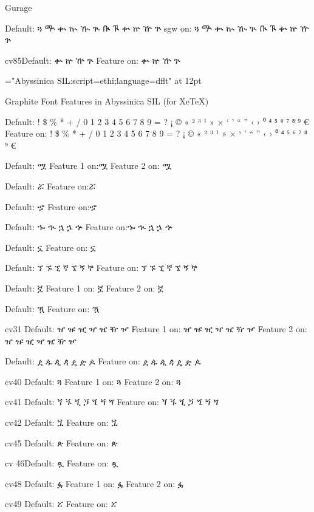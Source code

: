 \A Gurage

\IndSS  Default: ጓ ᎁ ቊ ኲ ዂ ጒ ᎅ ᎍ ቍ ኵ ዅ ጕ
\IndSS\sgw sgw on:  ጓ ᎁ ቊ ኲ ዂ ጒ ᎅ ᎍ ቍ ኵ ዅ ጕ

\IndSS cv85Default: ቍ ኵ ዅ ጕ 
\IndSS\eightyfive Feature on: ቍ ኵ ዅ ጕ


\font\C="Abyssinica SIL:script=ethi;language=dflt" at 12pt


\A Graphite Font Features in Abyssinica SIL (for XeTeX)

\IndSS Default: ! \$ \% * + / 0 1 2 3 4 5 6 7 8 9 = ? ¡ © « ² ³ ¹ » × ‘ ’ “ ” ‹ › ⁰ ⁴ ⁵ ⁶ ⁷ ⁸ ⁹ €
\IndSS\one Feature on: ! \$ \% * + / 0 1 2 3 4 5 6 7 8 9 = ? ¡ © « ² ³ ¹ » × ‘ ’ “ ” ‹ › ⁰ ⁴ ⁵ ⁶ ⁷ ⁸ ⁹ €


\IndSS Default: ሟ
\IndSS\fourone Feature 1 on:ሟ
\IndSS\fourtwo Feature 2 on: ሟ

\IndSS Default: ሯ
\IndSS\five Feature on:ሯ

\IndSS Default: ኇ
\IndSS\seventeen Feature on:ኇ

\IndSS Default: ኈ ኊ ኋ ኌ ኍ
\IndSS\eighteen Feature on:ኈ ኊ ኋ ኌ ኍ

\IndSS Default: ኗ
\IndSS\nineteen Feature on: ኗ

\IndSS Default: ኘ ኙ ኚ ኛ ኜ ኝ ኞ
\IndSS\twenty Feature on: ኘ ኙ ኚ ኛ ኜ ኝ ኞ

\IndSS Default: ኟ
\IndSS\twentyoneone Feature 1 on: ኟ
\IndSS\twentyonetwo Feature 2 on: ኟ

\IndSS Default: ዃ
\IndSS\twentysix Feature on: ዃ

\IndSS cv31 Default: ዠ ዡ ዢ ዣ ዤ ዥ ዦ
\IndSS\thirtyoneone Feature 1 on: ዠ ዡ ዢ ዣ ዤ ዥ ዦ
\IndSS\thirtyonetwo Feature 2 on: ዠ ዡ ዢ ዣ ዤ ዥ ዦ

\IndSS Default: ዸ ዹ ዺ ዻ ዼ ዽ ዾ
\IndSS\thirtytwo Feature on: ዸ ዹ ዺ ዻ ዼ ዽ ዾ

\IndSS cv40 Default: ጓ
\IndSS\fortyone Feature 1 on: ጓ
\IndSS\fortytwo Feature 2 on: ጓ

\IndSS cv41 Default: ጘ ጙ ጚ ጛ ጜ ጝ ጞ
\IndSS\fortyoneone Feature on: ጘ ጙ ጚ ጛ ጜ ጝ ጞ

\IndSS cv42 Default: ጟ
\IndSS\fortytwoone Feature on: ጟ

\IndSS cv45 Default: ጵ
\IndSS\fortyfive Feature on: ጵ

\IndSS cv 46Default: ጿ
\IndSS\fortysix Feature on: ጿ

\IndSS cv48 Default: ፏ
\IndSS\fortyeightone Feature 1 on: ፏ
\IndSS\fortyeighttwo Feature 2 on: ፏ

\IndSS cv49 Default: ፘ
\IndSS\fortynine Feature on: ፘ

